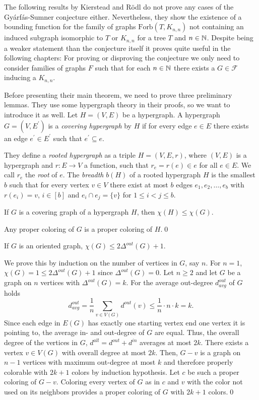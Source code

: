The following results by Kierstead and Rödl \cite{Ki96} do not prove any cases of the Gyárfás-Sumner conjecture either. Nevertheless, they show the existence of a bounding function for the family of graphs $\text{Forb}(T,K_{n,n})$ not containing an induced subgraph isomorphic to $T$ or $K_{n,n}$ for a tree $T$ and $n\in\mathbb{N}$. Despite being a weaker statement than the conjecture itself it proves quite useful in the following chapters: For proving or disproving the conjecture we only need to consider families of graphs $F$ such that for each $n\in\mathbb{N}$ there exists a $G\in\mathcal{F}$ inducing a $K_{n,n}$.

Before presenting their main theorem, we need to prove three preliminary lemmas. They use some hypergraph theory in their proofs, so we want to introduce it as well. Let $H=(V,E)$ be a hypergraph. A hypergraph $G=(V,E^\prime)$ is a \textit{covering hypergraph} by $H$ if for every edge $e\in E$ there exists an edge $e^\prime\in E^\prime$ such that $e^\prime\subseteq e$. 

They define a \textit{rooted hypergraph} as a triple $H=(V,E,r)$, where $(V,E)$ is a hypergraph and $r:E\to V$ a function, such that $r_e=r(e)\in e$ for all $e\in E$. We call $r_e$ the \textit{root} of $e$. The \textit{breadth} $b(H)$ of a rooted hypergraph $H$ is the smallest $b$ such that for every vertex $v\in V$ there exist at most $b$ edges $e_1,e_2,\dots ,e_b$ with $r(e_i)=v$, $i\in [b]$ and $e_i\cap e_j= \{v\}$ for $1\leq i<j\leq b$.

\begin{lemma}\label{l1cr}
If $G$ is a covering graph of a hypergraph $H$, then $\chi (H)\leq\chi (G)$.
\end{lemma}
\begin{prf}
Any proper coloring of $G$ is a proper coloring of $H$.\qed
\end{prf}

\begin{lemma}\label{l2cr}
If $G$ is an oriented graph, $\chi (G)\leq 2\Delta^{out}(G) +1$.
\end{lemma}
\begin{prf}
We prove this by induction on the number of vertices in $G$, say $n$. For $n=1$, $\chi (G) =1\leq 2\Delta^{out}(G) +1$ since $\Delta^{out}(G)=0$.
Let $n\geq 2$ and let $G$ be a graph on $n$ vertices with $\Delta^{out}(G)=k$. For the average out-degree $d_{avg}^{out}$ of $G$ holds \[d_{avg}^{out}=\dfrac{1}{n}\sum_{v\in V(G)}d^{out}(v)\leq\dfrac{1}{n} \cdot n\cdot k=k.\] Since each edge in $E(G)$ has exactly one starting vertex end one vertex it is pointing to, the average in- and out-degree of $G$ are equal. Thus, the overall degree of the vertices in $G$, $d^{all}=d^{out}+d^{in}$ averages at most $2k$. There exists a vertex $v\in V(G)$ with overall degree at most $2k$. Then, $G-v$ is a graph on $n-1$ vertices with maximum out-degree at most $k$ and therefore properly colorable with $2k+1$ colors by induction hypothesis. Let $c$ be such a proper coloring of $G-v$. Coloring every vertex of $G$ as in $c$ and $v$ with the color not used on its neighbors provides a proper coloring of $G$ with $2k+1$ colors.\qed
\end{prf}

